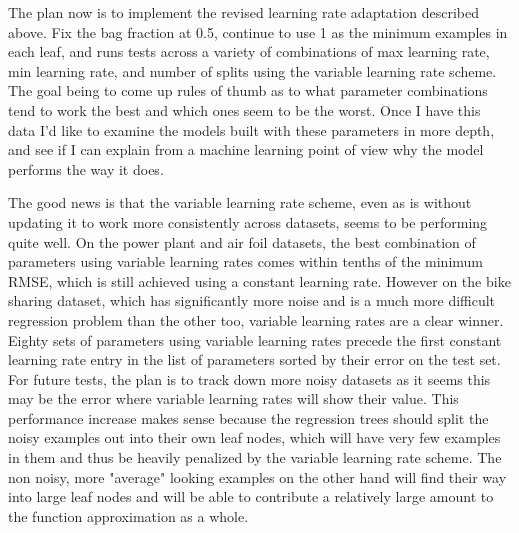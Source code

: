 \documentclass[runningheads]{llncs_2}
\begin{document}
The plan now is to implement the revised learning rate adaptation described above. Fix the bag fraction at 0.5, continue to use 1 as the minimum examples in each leaf, and runs tests across a variety of combinations of max learning rate, min learning rate, and number of splits using the variable learning rate scheme. The goal being to come up rules of thumb as to what parameter combinations tend to work the best and which ones seem to be the worst. Once I have this data I'd like to examine the models built with these parameters in more depth, and see if I can explain from a machine learning point of view why the model performs the way it does.

The good news is that the variable learning rate scheme, even as is without updating it to work more consistently across datasets, seems to be performing quite well. On the power plant and air foil datasets, the best combination of parameters using variable learning rates comes within tenths of the minimum RMSE, which is still achieved using a constant learning rate. However on the bike sharing dataset, which has significantly more noise and is a much more difficult regression problem than the other too, variable learning rates are a clear winner. Eighty sets of parameters using variable learning rates precede the first constant learning rate entry in the list of parameters sorted by their error on the test set. For future tests, the plan is to track down more noisy datasets as it seems this may be the error where variable learning rates will show their value. This performance increase makes sense because the regression trees should split the noisy examples out into their own leaf nodes, which will have very few examples in them and thus be heavily penalized by the variable learning rate scheme. The non noisy, more "average" looking examples on the other hand will find their way into large leaf nodes and will be able to contribute a relatively large amount to the function approximation as a whole.





\end{document}
